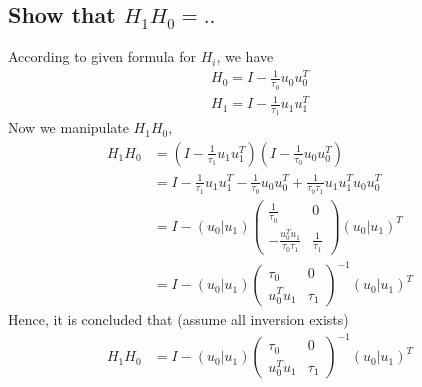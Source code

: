 \documentclass[11pt,a4paper]{article}
\begin{document}
\subsection{Show that $H_1 H_0 = ..$}
According to given formula for $H_i$, we have
\begin{align}
    H_0 = I - \frac{1}{\tau_0} u_0 u_0^T \\
    H_1 = I - \frac{1}{\tau_1} u_1 u_1^T
\end{align}
Now we manipulate $H_1 H_0$,
\begin{align}
    H_1 H_0 
    &= (I - \frac{1}{\tau_1} u_1 u_1^T) (I - \frac{1}{\tau_0} u_0 u_0^T) \\
    &= I - \frac{1}{\tau_1} u_1 u_1^T - \frac{1}{\tau_0} u_0 u_0^T  +
     \frac{1}{\tau_0\tau_1} u_1u_1^T u_0u_0^T \\
     &= I - (u_0 | u_1) 
     \left( \begin{array}{c|c} 
             \frac{1}{\tau_0} & 0 \\ \hline
             - \frac{u_0^T u_1}{\tau_0\tau_1} & \frac{1}{\tau_1}
         \end{array} \right)
     (u_0 | u_1)^T \\
     &= I - (u_0 | u_1) 
     \left( \begin{array}{c|c} 
             \tau_0 & 0 \\ \hline
              u_0^T u_1 & \tau_1
          \end{array} \right)^{-1}
     (u_0 | u_1)^T
\end{align}
Hence, it is concluded that (assume all inversion exists)
\begin{align}
    H_1 H_0 &= I - (u_0 | u_1) 
     \left( \begin{array}{c|c} 
             \tau_0 & 0 \\ \hline
              u_0^T u_1 & \tau_1
          \end{array} \right)^{-1}
     (u_0 | u_1)^T
\end{align}
\end{document}
